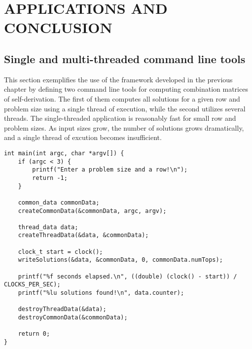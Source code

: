 \chapter{APPLICATIONS AND CONCLUSION}


\section{Single and multi-threaded command line tools}

This section exemplifies the use of the framework developed in the previous chapter by defining two command line tools for computing combination matrices of self-derivation. The first of them computes all solutions for a given row and problem size using a single thread of execution, while the second utilizes several threads. The single-threaded application is reasonably fast for small row and problem sizes. As input sizes grow, the number of solutions grows dramatically, and a single thread of excution becomes insufficient.

\begin{lstlisting}[caption={A single-threaded command line tool.},label={singleMain}]
int main(int argc, char *argv[]) {
    if (argc < 3) {
        printf("Enter a problem size and a row!\n");
        return -1;
    }

    common_data commonData;
    createCommonData(&commonData, argc, argv);

    thread_data data;
    createThreadData(&data, &commonData);

    clock_t start = clock();
    writeSolutions(&data, &commonData, 0, commonData.numTops);

    printf("%f seconds elapsed.\n", ((double) (clock() - start)) / CLOCKS_PER_SEC);
    printf("%lu solutions found!\n", data.counter);

    destroyThreadData(&data);
    destroyCommonData(&commonData);

    return 0;
}
\end{lstlisting}

